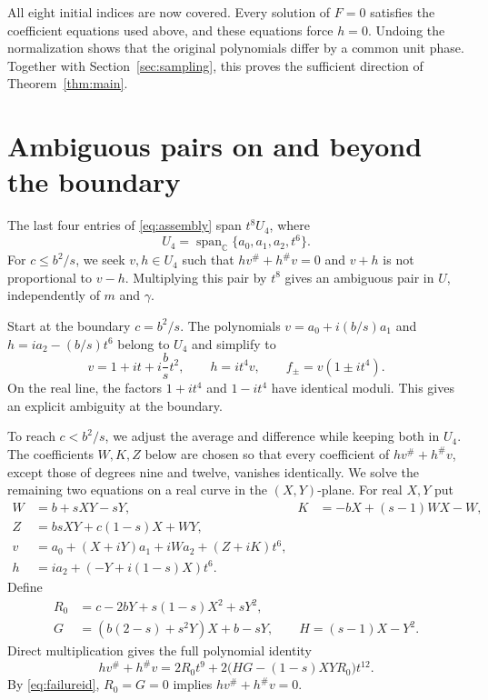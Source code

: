 \documentclass[11pt,a4paper]{article}
\newcommand{\CC}{\mathbb C}
\begin{document}
All eight initial indices are now covered. Every solution of $F=0$
satisfies the coefficient equations used above, and these equations
force $h=0$.
Undoing the normalization shows that the original polynomials differ by a common unit phase. Together with
Section~\ref{sec:sampling}, this proves the sufficient direction of
Theorem~\ref{thm:main}.

\section{Ambiguous pairs on and beyond the boundary}\label{sec:failure}
The last four entries of \eqref{eq:assembly} span
$t^8U_4$, where
\[
 U_4=\operatorname{span}_{\CC}\{a_0,a_1,a_2,t^6\}.
\]
For $c\le b^2/s$, we seek $v,h\in U_4$ such that $hv^\#+h^\#v=0$
and $v+h$ is not proportional to $v-h$. Multiplying this pair by $t^8$
gives an ambiguous pair in $U$, independently of $m$ and $\gamma$.

Start at the boundary $c=b^2/s$. The polynomials
$v=a_0+i(b/s)a_1$ and $h=ia_2-(b/s)t^6$ belong to $U_4$ and simplify to
\[
 v=1+it+i\frac bs t^2,\qquad h=it^4v,
 \qquad f_\pm=v(1\pm it^4).
\]
On the real line, the factors $1+it^4$ and $1-it^4$ have identical
moduli. This gives an explicit ambiguity at the boundary.

To reach $c<b^2/s$, we adjust the average and difference while keeping
both in $U_4$. The coefficients $W,K,Z$ below are chosen so that every
coefficient of $hv^\#+h^\#v$, except those of degrees nine and twelve,
vanishes identically. We solve the remaining two equations on a real curve
in the $(X,Y)$-plane.
For real $X,Y$ put
\begin{align*}
 W&=b+sXY-sY,&K&=-bX+(s-1)WX-W,\\
 Z&=bsXY+c(1-s)X+WY,\\
 v&=a_0+(X+iY)a_1+iW a_2+(Z+iK)t^6,\\
 h&=ia_2+(-Y+i(1-s)X)t^6.
\end{align*}
Define
\[
\begin{aligned}
 R_0&=c-2bY+s(1-s)X^2+sY^2,\\
 G&=(b(2-s)+s^2Y)X+b-sY,\qquad H=(s-1)X-Y^2.
\end{aligned}
\]
Direct multiplication gives the full polynomial identity
\begin{equation}\label{eq:failureid}
 hv^\#+h^\#v=2R_0t^9+2\bigl(HG-(1-s)XYR_0\bigr)t^{12}.
\end{equation}
By \eqref{eq:failureid}, $R_0=G=0$ implies $hv^\#+h^\#v=0$.
\end{document}
